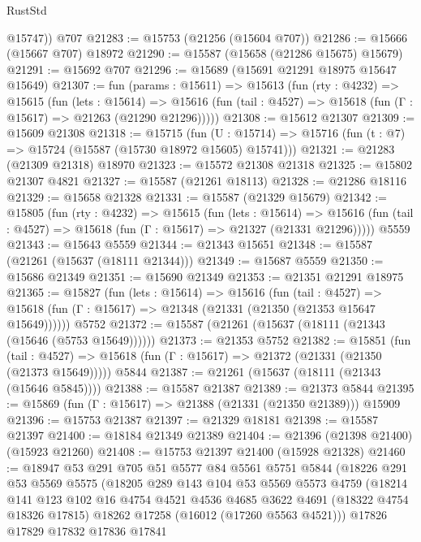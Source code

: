 \begin{lexlean}{RustStd}
\begin{coremodule}
        @15747))
    @707
@21283 := @15753 (@21256 (@15604 @707))
@21286 := @15666 (@15667 @707) @18972
@21290 := @15587 (@15658 (@21286 @15675) @15679)
@21291 := @15692 @707
@21296 := @15689 (@15691 @21291 @18975 @15647 @15649)
@21307 := fun (params : @15611) =>
  @15613
    (fun (rty : @4232) =>
    @15615
      (fun (lets : @15614) =>
      @15616 (fun (tail : @4527) => @15618 (fun (Γ : @15617) => @21263 (@21290 @21296)))))
@21308 := @15612 @21307
@21309 := @15609 @21308
@21318 := @15715
    (fun (U : @15714) => @15716 (fun (t : @7) => @15724 (@15587 (@15730 @18972 @15605) @15741)))
@21321 := @21283 (@21309 @21318) @18970
@21323 := @15572 @21308 @21318
@21325 := @15802 @21307 @4821
@21327 := @15587 (@21261 @18113)
@21328 := @21286 @18116
@21329 := @15658 @21328
@21331 := @15587 (@21329 @15679)
@21342 := @15805
    (fun (rty : @4232) =>
    @15615
      (fun (lets : @15614) =>
      @15616 (fun (tail : @4527) => @15618 (fun (Γ : @15617) => @21327 (@21331 @21296)))))
    @5559
@21343 := @15643 @5559
@21344 := @21343 @15651
@21348 := @15587 (@21261 (@15637 (@18111 @21344)))
@21349 := @15687 @5559
@21350 := @15686 @21349
@21351 := @15690 @21349
@21353 := @21351 @21291 @18975
@21365 := @15827
    (fun (lets : @15614) =>
    @15616
      (fun (tail : @4527) =>
      @15618 (fun (Γ : @15617) => @21348 (@21331 (@21350 (@21353 @15647 @15649))))))
    @5752
@21372 := @15587 (@21261 (@15637 (@18111 (@21343 (@15646 (@5753 @15649))))))
@21373 := @21353 @5752
@21382 := @15851
    (fun (tail : @4527) => @15618 (fun (Γ : @15617) => @21372 (@21331 (@21350 (@21373 @15649)))))
    @5844
@21387 := @21261 (@15637 (@18111 (@21343 (@15646 @5845))))
@21388 := @15587 @21387
@21389 := @21373 @5844
@21395 := @15869 (fun (Γ : @15617) => @21388 (@21331 (@21350 @21389))) @15909
@21396 := @15753 @21387
@21397 := @21329 @18181
@21398 := @15587 @21397
@21400 := @18184 @21349 @21389
@21404 := @21396 (@21398 @21400) (@15923 @21260)
@21408 := @15753 @21397 @21400 (@15928 @21328)
@21460 := @18947
    @53
    @291
    @705
    @51
    @5577
    @84
    @5561
    @5751
    @5844
    (@18226
      @291
      @53
      @5569
      @5575
      (@18205
        @289
        @143
        @104
        @53
        @5569
        @5573
        @4759
        (@18214
          @141
          @123
          @102
          @16
          @4754
          @4521
          @4536
          @4685
          @3622
          @4691
          (@18322 @4754 @18326 @17815)
          @18262
          @17258
          (@16012 (@17260 @5563 @4521)))
        @17826
        @17829
        @17832
        @17836
        @17841

\end{coremodule}
\end{lexlean}
